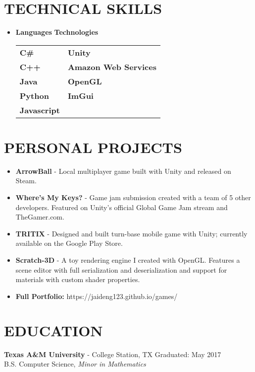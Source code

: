 \documentclass[margin,10pt]{res} %
\begin{document}
\begin{resume}
\section{TECHNICAL SKILLS}	
							\begin{itemize}
                    		\item[] 
\textbf{\large Languages}  \hspace*{.5in} \textbf{\large Technologies}        \\
\begin{tabular}{ll}
\textbf{C\#} \hspace*{1in}  & \textbf{Unity} \\
\textbf{C++} & \textbf{Amazon Web Services} \\
\textbf{Java}   & \textbf{OpenGL}       \\
\textbf{Python}  & \textbf{ImGui}               \\
\textbf{Javascript} &  \\                
\end{tabular}
                    		\end{itemize} 
\section{PERSONAL PROJECTS}
				\begin{itemize}       
				\item \textbf{ArrowBall} - Local multiplayer game built with Unity and released on Steam.
                	\item \textbf{Where's My Keys?} - Game jam submission created with a team of 5 other developers. Featured on Unity's official Global Game Jam stream and TheGamer.com.
                	\item \textbf{TRITIX} - Designed and built turn-base mobile game with Unity; currently available on the Google Play Store.
                	\item \textbf{Scratch-3D} - A toy rendering engine I created with OpenGL. Features a scene editor with full serialization and deserialization and support for materials with custom shader properties.
                	\item \textbf{Full Portfolio:} https://jaideng123.github.io/games/
                \end{itemize}
                
\section{EDUCATION}
{\bf Texas A\&M University} - College Station, TX \hfill
Graduated: May 2017 \\
B.S. Computer Science,
\textit{Minor in Mathematics}
\end{resume} 
\end{document}
